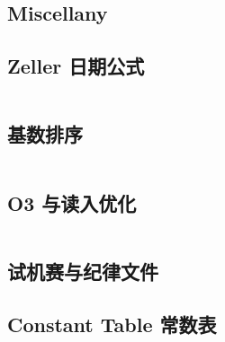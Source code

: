 \documentclass[titlepage, a4paper]{article}
\begin{document}
\begin{multicols}{2}
\begin{spacing}{0.6}
			\section{Miscellany}
				\subsection{Zeller 日期公式}
					\inputminted{cpp}{src/Miscellany/日期公式.cpp}
				\subsection{基数排序}
					\inputminted{cpp}{src/Miscellany/RadixSort.cpp}
				\subsection{O3 与读入优化}
					\inputminted{cpp}{src/Miscellany/hack.cpp}
				\subsection{试机赛与纪律文件}
				\begin{spacing}{0.5}
					
				\end{spacing}
				\subsection{Constant Table 常数表}
				\label{randomprimes}
				\begin{small}
					\setlength{\parindent}{0em}\setlength{\parskip}{0em}\renewcommand{\baselinestretch}{.8}
					\texttt{}
				\end{small}
				

\end{spacing}
\end{multicols}
\end{document}

